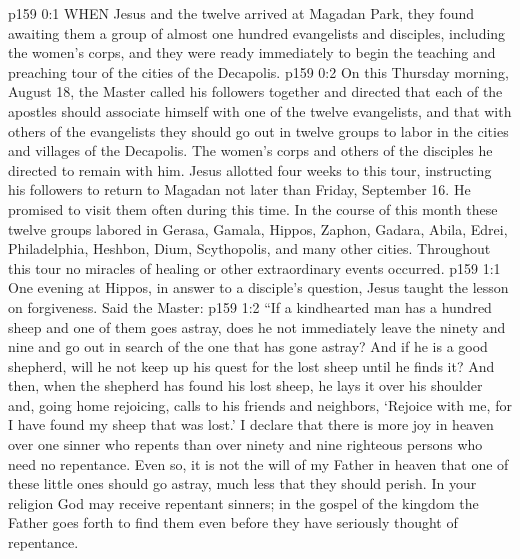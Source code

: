 \vs p159 0:1 WHEN Jesus and the twelve arrived at Magadan Park, they found awaiting them a group of almost one hundred evangelists and disciples, including the women’s corps, and they were ready immediately to begin the teaching and preaching tour of the cities of the Decapolis.
\vs p159 0:2 On this Thursday morning, August 18, the Master called his followers together and directed that each of the apostles should associate himself with one of the twelve evangelists, and that with others of the evangelists they should go out in twelve groups to labor in the cities and villages of the Decapolis. The women’s corps and others of the disciples he directed to remain with him. Jesus allotted four weeks to this tour, instructing his followers to return to Magadan not later than Friday, September 16. He promised to visit them often during this time. In the course of this month these twelve groups labored in Gerasa, Gamala, Hippos, Zaphon, Gadara, Abila, Edrei, Philadelphia, Heshbon, Dium, Scythopolis, and many other cities. Throughout this tour no miracles of healing or other extraordinary events occurred.
\vs p159 1:1 One evening at Hippos, in answer to a disciple’s question, Jesus taught the lesson on forgiveness. Said the Master:
\vs p159 1:2 \pc \textcolor{ubdarkred}{“If a kindhearted man has a hundred sheep and one of them goes astray, does he not immediately leave the ninety and nine and go out in search of the one that has gone astray? And if he is a good shepherd, will he not keep up his quest for the lost sheep until he finds it? And then, when the shepherd has found his lost sheep, he lays it over his shoulder and, going home rejoicing, calls to his friends and neighbors, ‘Rejoice with me, for I have found my sheep that was lost.’ I declare that there is more joy in heaven over one sinner who repents than over ninety and nine righteous persons who need no repentance. Even so, it is not the will of my Father in heaven that one of these little ones should go astray, much less that they should perish. In your religion God may receive repentant sinners; in the gospel of the kingdom the Father goes forth to find them even before they have seriously thought of repentance.}

